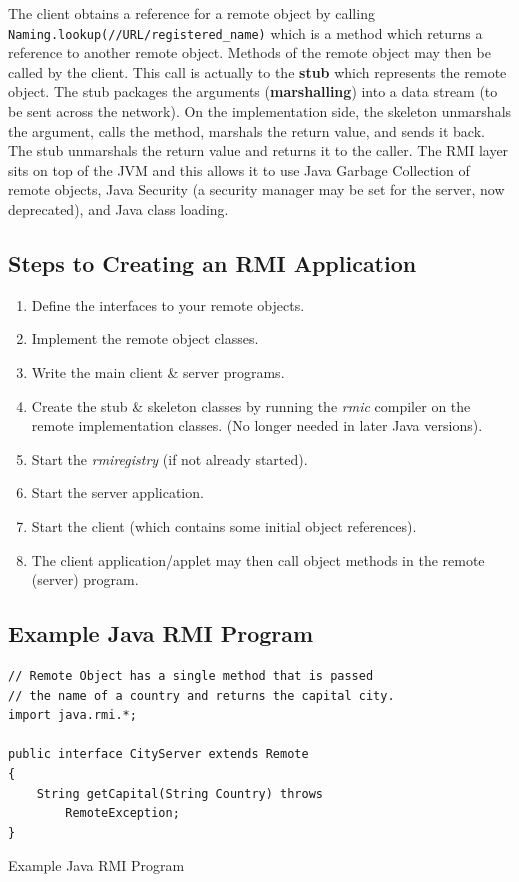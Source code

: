 \documentclass[a4paper,11pt]{article}
\newenvironment{code}{\captionsetup{type=listing}}{}
\begin{document}
The client obtains a reference for a remote object by calling \texttt{Naming.lookup(//URL/registered_name)} which is a method which returns a reference to another remote object.
Methods of the remote object may then be called by the client.
This call is actually to the \textbf{stub} which represents the remote object.
The stub packages the arguments (\textbf{marshalling}) into a data stream (to be sent across the network).
On the implementation side, the skeleton unmarshals the argument, calls the method, marshals the return value, and sends it back.
The stub unmarshals the return value and returns it to the caller.
The RMI layer sits on top of the JVM and this allows it to use Java Garbage Collection of remote objects, Java Security (a security manager may be set for the server, now deprecated), and Java class loading.

\subsection{Steps to Creating an RMI Application}
\begin{enumerate}
    \item   Define the interfaces to your remote objects.
    \item   Implement the remote object classes.
    \item   Write the main client \& server programs.
    \item   Create the stub \& skeleton classes by running the \textit{rmic} compiler on the remote implementation classes. (No longer needed in later Java versions).
    \item   Start the \textit{rmiregistry} (if not already started).
    \item   Start the server application.
    \item   Start the client (which contains some initial object references).
    \item   The client application/applet may then call object methods in the remote (server) program.
\end{enumerate}

\subsection{Example Java RMI Program}
\begin{code}
\begin{verbatim}
// Remote Object has a single method that is passed
// the name of a country and returns the capital city.
import java.rmi.*;

public interface CityServer extends Remote
{
    String getCapital(String Country) throws
        RemoteException;
}
\end{verbatim}
\caption{Example Java RMI Program}
\end{code}
\end{document}
